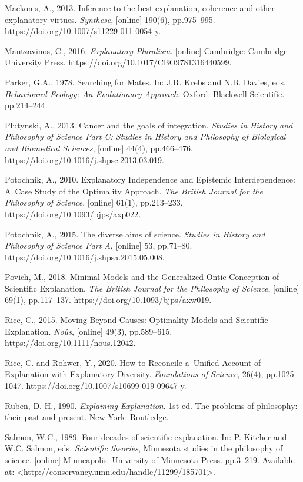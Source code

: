 Mackonis, A., 2013. Inference to the best explanation, coherence and other explanatory virtues. \textit{Synthese}, [online] 190(6), pp.975–995. https://doi.org/10.1007/s11229-011-0054-y.

Mantzavinos, C., 2016. \textit{Explanatory Pluralism}. [online] Cambridge: Cambridge University Press. https://doi.org/10.1017/CBO9781316440599.

Parker, G.A., 1978. Searching for Mates. In: J.R. Krebs and N.B. Davies, eds. \textit{Behavioural Ecology: An Evolutionary Approach}. Oxford: Blackwell Scientific. pp.214–244.

Plutynski, A., 2013. Cancer and the goals of integration. \textit{Studies in History and Philosophy of Science Part C: Studies in History and Philosophy of Biological and Biomedical Sciences}, [online] 44(4), pp.466–476. https://doi.org/10.1016/j.shpsc.2013.03.019.

Potochnik, A., 2010. Explanatory Independence and Epistemic Interdependence: A~Case Study of the Optimality Approach. \textit{The British Journal for the Philosophy of Science}, [online] 61(1), pp.213–233. https://doi.org/10.1093/bjps/axp022.

Potochnik, A., 2015. The diverse aims of science. \textit{Studies in History and Philosophy of Science Part A}, [online] 53, pp.71–80. https://doi.org/10.1016/j.shpsa.2015.05.008.

Povich, M., 2018. Minimal Models and the Generalized Ontic Conception of Scientific Explanation. \textit{The British Journal for the Philosophy of Science}, [online] 69(1), pp.117–137. https://doi.org/10.1093/bjps/axw019.

Rice, C., 2015. Moving Beyond Causes: Optimality Models and Scientific Explanation. \textit{Noûs}, [online] 49(3), pp.589–615. https://doi.org/10.1111/nous.12042.

Rice, C. and Rohwer, Y., 2020. How to Reconcile a~Unified Account of Explanation with Explanatory Diversity. \textit{Foundations of Science}, 26(4), pp.1025–1047. https://doi.org/10.1007/s10699-019-09647-y.

Ruben, D.-H., 1990. \textit{Explaining Explanation}. 1st ed. The problems of philosophy: their past and present. New York: Routledge.

Salmon, W.C., 1989. Four decades of scientific explanation. In: P. Kitcher and W.C. Salmon, eds. \textit{Scientific theories}, Minnesota studies in the philosophy of science. [online] Minneapolis: University of Minnesota Press. pp.3–219. Available at: {\textless}http://conservancy.umn.edu/handle/11299/185701{\textgreater}.

